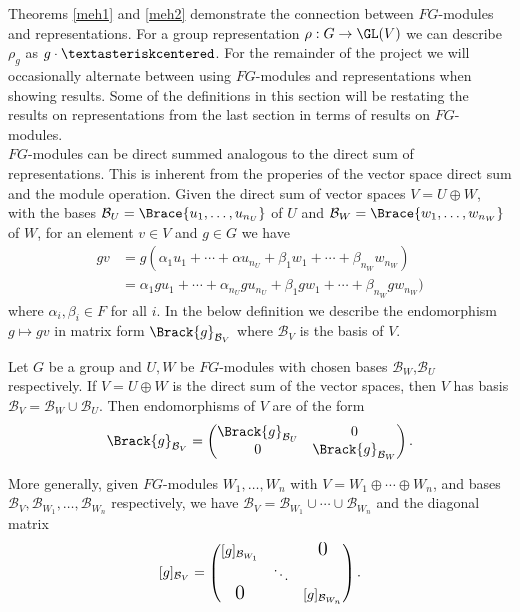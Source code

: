 \documentclass[../Project.tex]{subfiles}
\begin{document}
Theorems \ref{meh1} and \ref{meh2} demonstrate the connection between $FG$-modules and representations. For a group representation $\rho : G \to \GL(V)$ we can describe $\rho_g$ as $g \cdot \textasteriskcentered$.  For the remainder of the project we will occasionally alternate between using $FG$-modules and representations when showing results. Some of the definitions in this section will be restating the results on representations from the last section in terms of results on $FG$-modules.\\

$FG$-modules can be direct summed analogous to the direct sum of representations. This is inherent from the properies of the vector space direct sum and the module operation. Given the direct sum of vector spaces $V = U \oplus W$, with the bases $\mathcal{B}_U = \Brace{u_1,\dots,u_{n_U}}$ of $U$ and $\mathcal{B}_W = \Brace{w_1,\dots,w_{n_W}}$ of $W$, for an element $v \in V$ and $g \in G$ we have
\begin{align*}
gv &= g(\alpha_1u_1 + \cdots + \alpha u_{n_U} + \beta_1w_1 + \cdots + \beta_{n_W}w_{n_W}) \\&= \alpha_1gu_1 + \cdots + \alpha_{n_U}gu_{n_U} + \beta_1gw_1 + \cdots + \beta_{n_W}gw_{n_W})
\end{align*}
where $\alpha_i,\beta_i \in F$ for all $i$. In the below definition we describe the endomorphism $g \mapsto gv$ in matrix form $\Brack{g}_{\mathcal{B}_V}$ where $\mathcal{B}_V$ is the basis of $V$.\\

\begin{defi}
	\label{directsumoffg}
	 Let $G$ be a group and $U,W$ be $FG$-modules with chosen bases $\mathcal{B}_W$,$\mathcal{B}_U$ respectively. If $V = U \oplus W$ is the direct sum of the vector spaces, then $V$ has basis $\mathcal{B}_V = \mathcal{B}_W\cup\mathcal{B}_U$. Then endomorphisms of $V$ are of the form
	$$\Brack{g}_{\mathcal{B}_V} = \begin{pmatrix}\Brack{g}_{\mathcal{B}_U} & 0 \\ 0 & \Brack{g}_{\mathcal{B}_W}\end{pmatrix}.$$

More generally, given $FG$-modules $W_1,\dots,W_n$ with $V = W_1 \oplus \cdots \oplus W_n$, and bases $\mathcal{B}_V,{\mathcal{B}_{W_1}},\dots,{\mathcal{B}_{W_n}}$ respectively, we have $\mathcal{B}_V ={\mathcal{B}_{W_1}}\cup \cdots\cup {\mathcal{B}_{W_n}}$ and the diagonal matrix
$$[g]_{\mathcal{B}_V} = \begin{pmatrix} 
	    [g]_{\mathcal{B}_{W_1}}&  & \text{\Large{0}} \\
	    & \ddots& \\
	    \text{\Large{0}} & & [g]_{\mathcal{B}_{W_n}}
\end{pmatrix}.$$\\
\end{defi}
\end{document}
